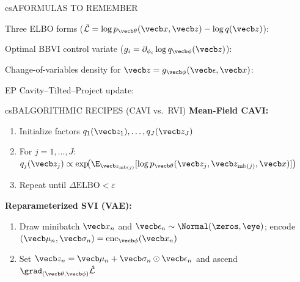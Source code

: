 \documentclass[../../../../master.tex]{subfiles}
\begin{document}
\begin{cscolumns}
\begin{cscard}{csA}{FORMULAS TO REMEMBER}
  \begin{csbul}
    \item Three ELBO forms ($\tilde{\mathcal L}=\log p_{\vecb\theta}(\vecb x,\vecb z)-\log q(\vecb z)$):
    \item Optimal BBVI control variate ($g_i=\partial_{\phi_i}\log q_{\vecb\phi}(\vecb z)$):
    \item Change-of-variables density for $\vecb z = g_{\vecb\phi}(\vecb\epsilon,\vecb x)$:
    \item EP Cavity--Tilted--Project update:
  \end{csbul}
\end{cscard}

\begin{cscard}{csB}{ALGORITHMIC RECIPES (CAVI vs.\ RVI)}
  \textbf{Mean-Field CAVI:}
  \begin{enumerate}[leftmargin=1.2em, itemsep=0.5pt, topsep=0.5pt, parsep=0pt]
    \item Initialize factors $q_1(\vecb z_1),\dots,q_J(\vecb z_J)$
    \item For $j=1,\dots,J$: $q_j(\vecb z_j)\propto\exp\!\bigl(\E_{\vecb z_{\mathrm{mb}(j)}}[\log p_{\vecb\theta}(\vecb z_j,\vecb z_{\mathrm{mb}(j)},\vecb x)]\bigr)$
    \item Repeat until $\Delta\mathrm{ELBO}<\varepsilon$
  \end{enumerate}
  \textbf{Reparameterized SVI (VAE):}
  \begin{enumerate}[leftmargin=1.2em, itemsep=0.5pt, topsep=0.5pt, parsep=0pt]
    \item Draw minibatch $\vecb x_n$ and $\vecb\epsilon_n\sim\Normal(\zeros,\eye)$; encode $(\vecb\mu_n,\vecb\sigma_n)=\mathrm{enc}_{\vecb\phi}(\vecb x_n)$
    \item Set $\vecb z_n=\vecb\mu_n+\vecb\sigma_n\odot\vecb\epsilon_n$ and ascend $\grad_{(\vecb\theta,\vecb\phi)}\hat{\mathcal L}$
  \end{enumerate}
\end{cscard}
\columnbreak


\end{cscolumns}
\end{document}
